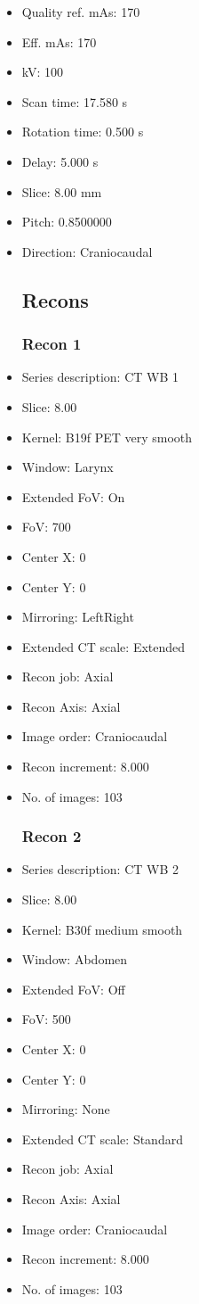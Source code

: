 \documentclass[12pt]{article}
\begin{document}
\begin{itemize}
\subsection{Scan}
\item Quality ref. mAs: 170\item Eff. mAs: 170\item kV: 100\item Scan time: 17.580 s\item Rotation time: 0.500 s\item Delay: 5.000 s\item Slice: 8.00 mm\item Pitch: 0.8500000\item Direction: Craniocaudal\subsection{Recons}

\subsubsection{Recon 1}
\item Series description: CT WB 1
\item Slice: 8.00
\item Kernel: B19f PET very smooth
\item Window: Larynx
\item Extended FoV: On
\item FoV: 700
\item Center X: 0
\item Center Y: 0
\item Mirroring: LeftRight
\item Extended CT scale: Extended
\item Recon job: Axial
\item Recon Axis: Axial
\item Image order: Craniocaudal
\item Recon increment: 8.000
\item No. of images: 103
\subsubsection{Recon 2}
\item Series description: CT WB 2
\item Slice: 8.00
\item Kernel: B30f medium smooth
\item Window: Abdomen
\item Extended FoV: Off
\item FoV: 500
\item Center X: 0
\item Center Y: 0
\item Mirroring: None
\item Extended CT scale: Standard
\item Recon job: Axial
\item Recon Axis: Axial
\item Image order: Craniocaudal
\item Recon increment: 8.000
\item No. of images: 103

\end{itemize}
\end{document}
